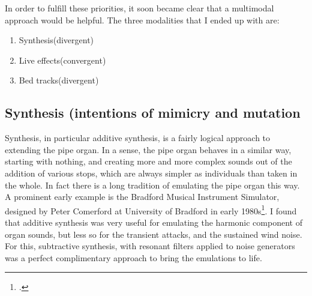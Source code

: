 \documentclass[12pt,twoside,maitrise]{dms_ks}
\theoremstyle{definition}
\begin{document}
{In order to fulfill these priorities, it soon became clear that a multimodal approach would be helpful. The three modalities that I ended up with are:

\begin{enumerate}
  \item Synthesis(divergent)
  
  \item Live effects(convergent)
  
  \item Bed tracks(divergent)
\end{enumerate}

\subsection{Synthesis (intentions of mimicry and mutation}

Synthesis, in particular additive synthesis, is a fairly logical approach to extending the pipe organ. 
In a sense, the pipe organ behaves in a similar way, starting with nothing, and creating more and more complex sounds out of the addition of various stops, which are always simpler as individuals than taken in the whole. 
In fact there is a long tradition of emulating the pipe organ this way. 
A prominent early example is the Bradford Musical Instrument Simulator, designed by Peter Comerford at University of Bradford in early 1980s\footcite[61]{comerford_simulating_1993}. 
I found that additive synthesis was very useful for emulating the harmonic component of organ sounds, but less so for the transient attacks, and the sustained wind noise. 
For this, subtractive synthesis, with resonant filters applied to noise generators was a perfect complimentary approach to bring the emulations to life.


}
\end{document}
